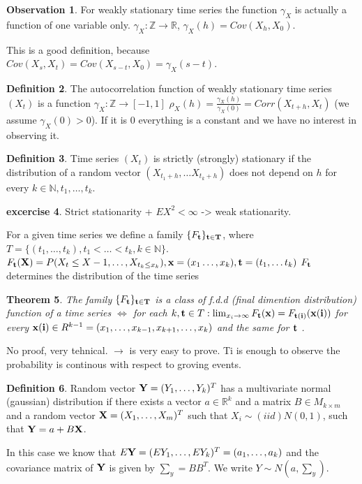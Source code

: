 \documentclass[12pt,a4paper]{amsart}
\theoremstyle{definition} %
\newtheorem{defn}{Definition}[section]
\newtheorem{excercise}[defn]{excercise}
\newtheorem{observation}[defn]{Observation}
\theoremstyle{plain} %
\newtheorem{theorem}[defn]{Theorem}
\newcommand{\R}{\mathbb R}
\newcommand{\N}{\mathbb N}
\newcommand{\Z}{\mathbb Z}
\begin{document}
\begin{observation}
For weakly stationary time series the function $\gamma_X$ is actually a function of one variable only. 
$\gamma_X : \Z \rightarrow \R$,
$\gamma_X(h) = Cov(X_h, X_0)$.

This is a good definition, because $Cov(X_s, X_t) = Cov(X_{s-t},X_0) = \gamma_X(s-t)$. 
\end{observation}


\begin{defn}
The autocorrelation function of weakly stationary time series $(X_t)$ is a function
$\gamma_X : \Z \rightarrow [-1, 1]$
$\rho_X(h) = \frac{\gamma_X(h)}{\gamma_X(0)} = Corr(X_{t+h},X_t)$
(we assume $\gamma_X(0) > 0$). If it is $0$ everything is a constant and we have no interest in observing it.
\end{defn}

\begin{defn}
Time series $(X_t)$ is strictly (strongly) stationary if the distribution of a random vector $(X_{t_1 + h}, \dots X_{t_k + h})$ does not depend on $h$ for every $k\in \N, t_1, \dots, t_k$.
\end{defn}

\begin{excercise}
Strict stationarity + $EX^2 < \infty$ -> weak stationarity.
\end{excercise}

For a given time series we define a family 
$\{  F_{\bf t} \}_{\bf t \in T}$, where $T = \{(t_1, \dots, t_k), t_1 < \dots < t_k, k \in \N\}$.
$F_{\bf t}({\bf X}) = P(X_t \leq X-1, \dots, X_{t_k \leq x_k}), {\bf x} = (x_1 \dots, x_k), {\bf t} = (t_1, \dots t_k)$
$F_{ \bf t}$ determines the distribution of the time series


\begin{theorem}
The family $\{F_{\bf t}\}_{\bf t \in T}$ is a class of f.d.d (final dimention distribution) function of a time series
$\Leftrightarrow$
for each $k, {\bf t } \in T: \lim_{x_i \rightarrow \infty} F_{\bf t}({\bf x}) = F_{\bf t(i)}({\bf x(i)})$
for every ${\bf x(i)} \in R^{k-1} = (x_1,\dots,x_{k-1},x_{k+1},\dots, x_k)$ and the same for ${\bf t}$ .
\end{theorem}
\proof
No proof, very tehnical. 
$\rightarrow$ is very easy to prove. Ti is enough to observe the probability is continous with respect to groving events.
\endproof



\begin{defn}
Random vector ${\bf Y } = (Y_1, \dots, Y_k)^T$ has a multivariate normal (gaussian) distribution if there exists a vector $a \in \R^k$ and a matrix $B \in M_{k\times m}$ and a random vector ${\bf X} = (X_1, \dots, X_m)^T$ such that $X_i \sim(iid) N(0,1)$, such that ${\bf Y} = a + B {\bf X}$.

In this case we know that $E{\bf Y} = (EY_1, \dots, EY_k)^T = (a_1, \dots, a_k)$ and the covariance matrix of ${\bf Y}$ is given by $\sum_y = B B^T$.
We write $Y \sim N(a, \sum_y)$.

\end{defn}
\end{document}
